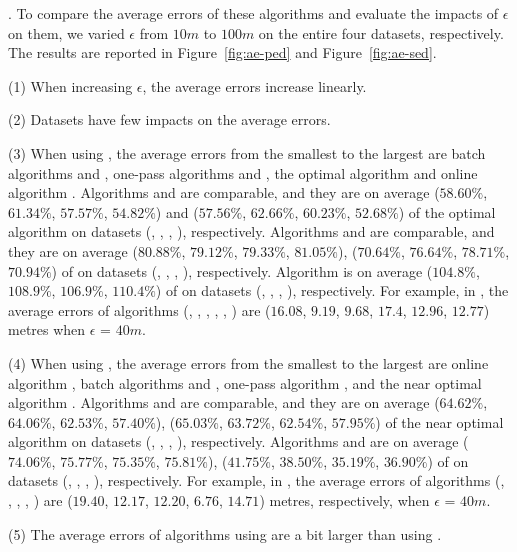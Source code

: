 .
To compare the average errors of these algorithms and evaluate the impacts of $\epsilon$ on them, we varied $\epsilon$ from $10m$ to $100m$ on the entire four datasets, respectively.
The results are reported in Figure~\ref{fig:ae-ped} and Figure~\ref{fig:ae-sed}.


\sstab (1) When increasing $\epsilon$, the average errors increase linearly. 

\sstab (2) Datasets have few impacts on the average errors.

\sstab (3) When using \ped, the average errors from the smallest
to the largest are batch algorithms \tpa and \dpa, one-pass
algorithms \siped and \operb, the optimal algorithm \optp and online algorithm \bqsa. 
Algorithms \tpa and
\dpa are comparable, and they are on average ($58.60\%$, $61.34\%$,
$57.57\%$, $54.82\%$) and ($57.56\%$, $62.66\%$, $60.23\%$, $52.68\%$) of the optimal algorithm \optp on datasets (\ucar, \geolife, \mopsi, \act), respectively.
Algorithms \siped and \operb are comparable, and they are on average
($80.88\%$, $79.12\%$, $79.33\%$, $81.05\%$), ($70.64\%$, $76.64\%$, $78.71\%$, $70.94\%$) of \optp on datasets (\ucar, \geolife, \mopsi, \act), respectively.
Algorithm \bqsa is on average ($104.8\%$, $108.9\%$, $106.9\%$, $110.4\%$) of \optp on datasets (\ucar, \geolife, \mopsi, \act), respectively.
%
For example, in \mopsi, the average errors of algorithms
(\optp, \tpa, \dpa, \bqsa, \siped, \operb ) are ($16.08$, $9.19$, $9.68$, $17.4$, $12.96$, $12.77$)  metres when $\epsilon$ = $40m$.

\sstab (4) When using \sed, the average errors from the smallest
to the largest are online algorithm \squishe, batch algorithms \tpa and \dpa,
one-pass algorithm \cised, and the near optimal algorithm \nopts.
Algorithms \tpa and \dpa are comparable, and they are on average
($64.62\%$, $64.06\%$, $62.53\%$, $57.40\%$), ($65.03\%$, $63.72\%$, $62.54\%$, $57.95\%$) of the near optimal algorithm \nopts on datasets (\ucar, \geolife,
\mopsi, \act), respectively.
Algorithms \cised and \squishe are on average ($74.06\%$, $75.77\%$, $75.35\%$, $75.81\%$), ($41.75\%$, $38.50\%$, $35.19\%$, $36.90\%$) of \nopts on datasets (\ucar, \geolife, \mopsi, \act), respectively.
%
For example, in \mopsi, the average errors of algorithms
(\nopts, \tpa, \dpa, \squishe, \cised) are ($19.40$, $12.17$, $12.20$, $6.76$, $14.71$) metres, respectively, when $\epsilon$ = $40m$.

\sstab (5) The average errors of algorithms using \sed are a bit larger than using \ped. 



